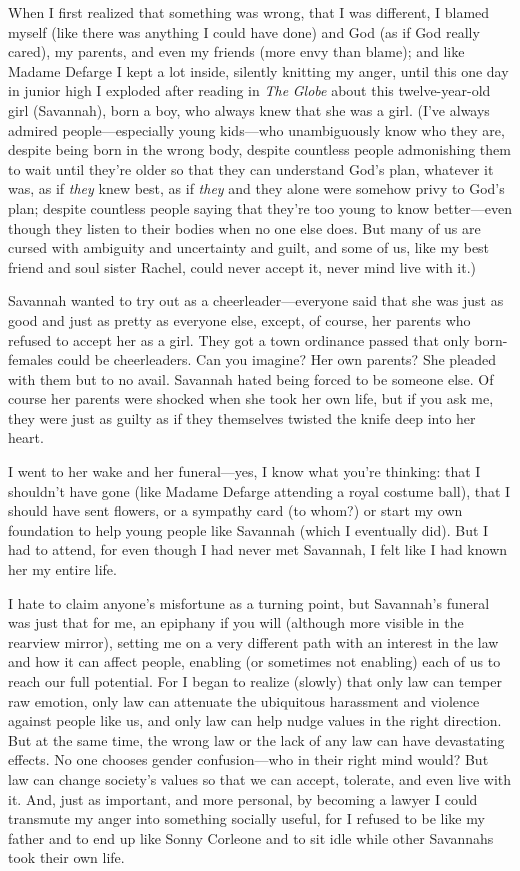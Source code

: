 When I first realized that something was wrong, that I was different, I
blamed myself (like there was anything I could have done) and God (as if
God really cared), my parents, and even my friends (more envy than
blame); and like Madame Defarge I kept a lot inside, silently knitting
my anger, until this one day in junior high I exploded after reading in
\emph{The} \emph{Globe} about this twelve-year-old girl (Savannah), born
a boy, who always knew that she was a girl. (I've always admired
people---especially young kids---who unambiguously know who they are,
despite being born in the wrong body, despite countless people
admonishing them to wait until they're older so that they can understand
God's plan, whatever it was, as if \emph{they} knew best, as if
\emph{they} and they alone were somehow privy to God's plan; despite
countless people saying that they're too young to know better---even
though they listen to their bodies when no one else does. But many of us
are cursed with ambiguity and uncertainty and guilt, and some of us,
like my best friend and soul sister Rachel, could never accept it, never
mind live with it.)

Savannah wanted to try out as a cheerleader---everyone said that she was
just as good and just as pretty as everyone else, except, of course, her
parents who refused to accept her as a girl. They got a town ordinance
passed that only born-females could be cheerleaders. Can you imagine?
Her own parents? She pleaded with them but to no avail. Savannah hated
being forced to be someone else. Of course her parents were shocked when
she took her own life, but if you ask me, they were just as guilty as if
they themselves twisted the knife deep into her heart.

I went to her wake and her funeral---yes, I know what you're thinking:
that I shouldn't have gone (like Madame Defarge attending a royal
costume ball), that I should have sent flowers, or a sympathy card (to
whom?) or start my own foundation to help young people like Savannah
(which I eventually did). But I had to attend, for even though I had
never met Savannah, I felt like I had known her my entire life.

I hate to claim anyone's misfortune as a turning point, but Savannah's
funeral was just that for me, an epiphany if you will (although more
visible in the rearview mirror), setting me on a very different path
with an interest in the law and how it can affect people, enabling (or
sometimes not enabling) each of us to reach our full potential. For I
began to realize (slowly) that only law can temper raw emotion, only law
can attenuate the ubiquitous harassment and violence against people like
us, and only law can help nudge values in the right direction. But at
the same time, the wrong law or the lack of any law can have devastating
effects. No one chooses gender confusion---who in their right mind
would? But law can change society's values so that we can accept,
tolerate, and even live with it. And, just as important, and more
personal, by becoming a lawyer I could transmute my anger into something
socially useful, for I refused to be like my father and to end up like
Sonny Corleone and to sit idle while other Savannahs took their own
life.


